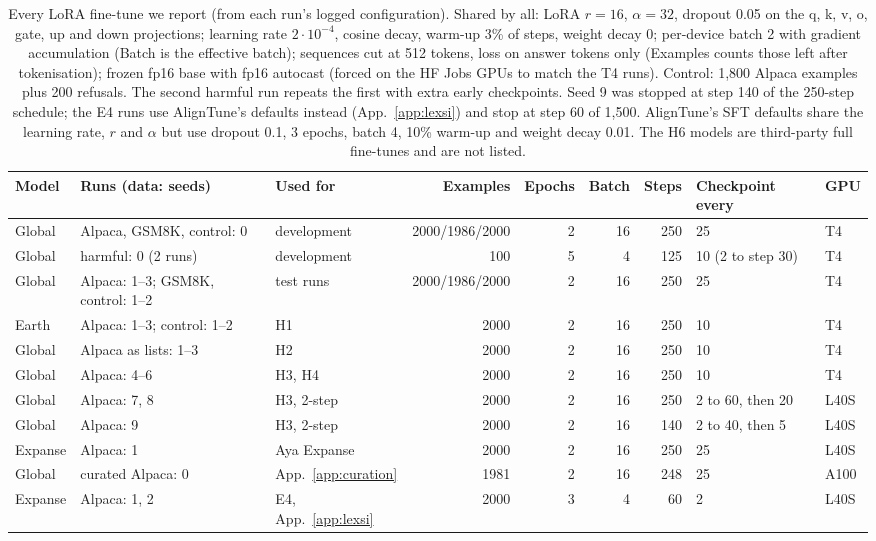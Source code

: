 \documentclass[11pt]{article}
\begin{document}
\begin{table}[t]
\centering\footnotesize
\setlength{\tabcolsep}{2.5pt}
\begin{tabular}{@{}l l l r r r r l l@{}}
\toprule
Model & Runs (data: seeds) & Used for & Examples & Epochs & Batch & Steps & Checkpoint every & GPU \\
\midrule
Global & Alpaca, GSM8K, control: 0 & development & 2000/1986/2000 & 2 & 16 & 250 & 25 & T4 \\
Global & harmful: 0 (2 runs) & development & 100 & 5 & 4 & 125 & 10 (2 to step 30) & T4 \\
Global & Alpaca: 1--3; GSM8K, control: 1--2 & test runs & 2000/1986/2000 & 2 & 16 & 250 & 25 & T4 \\
Earth & Alpaca: 1--3; control: 1--2 & H1 & 2000 & 2 & 16 & 250 & 10 & T4 \\
Global & Alpaca as lists: 1--3 & H2 & 2000 & 2 & 16 & 250 & 10 & T4 \\
Global & Alpaca: 4--6 & H3, H4 & 2000 & 2 & 16 & 250 & 10 & T4 \\
Global & Alpaca: 7, 8 & H3, 2-step & 2000 & 2 & 16 & 250 & 2 to 60, then 20 & L40S \\
Global & Alpaca: 9 & H3, 2-step & 2000 & 2 & 16 & 140 & 2 to 40, then 5 & L40S \\
Expanse & Alpaca: 1 & Aya Expanse & 2000 & 2 & 16 & 250 & 25 & L40S \\
Global & curated Alpaca: 0 & App.~\ref{app:curation} & 1981 & 2 & 16 & 248 & 25 & A100 \\
Expanse & Alpaca: 1, 2 & E4, App.~\ref{app:lexsi} & 2000 & 3 & 4 & 60 & 2 & L40S \\
\bottomrule
\end{tabular}
\caption{Every LoRA fine-tune we report (from each run's logged configuration). Shared by all: LoRA $r=16$,
$\alpha=32$, dropout 0.05 on the q, k, v, o, gate, up and down projections; learning rate $2\cdot10^{-4}$, cosine
decay, warm-up 3\% of steps, weight decay 0; per-device batch 2 with gradient accumulation (Batch is the effective
batch); sequences cut at 512 tokens, loss on answer tokens only (Examples counts those left after tokenisation);
frozen fp16 base with fp16 autocast (forced on the HF Jobs GPUs to match the T4
runs). Control: 1,800 Alpaca examples plus 200 refusals. The second harmful run repeats the first with extra early
checkpoints. Seed 9 was stopped at step 140 of the 250-step schedule; the E4 runs use AlignTune's defaults instead (App.~\ref{app:lexsi})
and stop at step 60 of 1,500. AlignTune's SFT defaults share the learning
rate, $r$ and $\alpha$ but use dropout 0.1, 3 epochs, batch 4, 10\% warm-up and weight decay 0.01. The H6 models are
third-party full fine-tunes \citep{seth2026safetune} and are not listed.}
\label{tab:hp}
\end{table}
\end{document}
